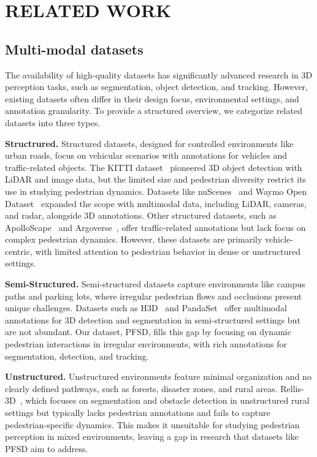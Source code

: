\section{RELATED WORK}
\subsection{Multi-modal datasets}
The availability of high-quality datasets has significantly advanced research in 3D perception tasks, such as segmentation, object detection, and tracking. However, existing datasets often differ in their design focus, environmental settings, and annotation granularity. To provide a structured overview, we categorize related datasets into three types.

\textbf{Structrured.} Structured datasets, designed for controlled environments like urban roads, focus on vehicular scenarios with annotations for vehicles and traffic-related objects. The KITTI dataset~\cite{kitti} pioneered 3D object detection with LiDAR and image data, but the limited size and pedestrian diversity restrict its use in studying pedestrian dynamics. Datasets like nuScenes~\cite{nuscenes} and Waymo Open Dataset~\cite{waymo} expanded the scope with multimodal data, including LiDAR, cameras, and radar, alongside 3D annotations. Other structured datasets, such as ApolloScape~\cite{huang2018apolloscape} and Argoverse~\cite{chang2019argoverse}, offer traffic-related annotations but lack focus on complex pedestrian dynamics. However, these datasets are primarily vehicle-centric, with limited attention to pedestrian behavior in dense or unstructured settings.

\textbf{Semi-Structured.} Semi-structured datasets capture environments like campus paths and parking lots, where irregular pedestrian flows and occlusions present unique challenges. Datasets such as H3D~\cite{h3d} and PandaSet~\cite{pandaset} offer multimodal annotations for 3D detection and segmentation in semi-structured settings but are not abundant. Our dataset, PFSD, fills this gap by focusing on dynamic pedestrian interactions in irregular environments, with rich annotations for segmentation, detection, and tracking.

\textbf{Unstructured.} Unstructured environments feature minimal organization and no clearly defined pathways, such as forests, disaster zones, and rural areas. Rellis-3D~\cite{rellis}, which focuses on segmentation and obstacle detection in unstructured rural settings but typically lacks pedestrian annotations and fails to capture pedestrian-specific dynamics. This makes it unsuitable for studying pedestrian perception in mixed environments, leaving a gap in research that datasets like PFSD aim to address.

